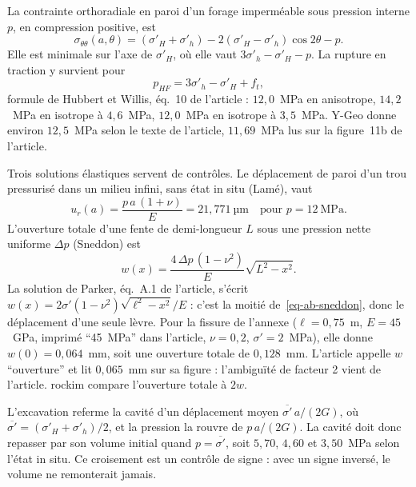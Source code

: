 La contrainte orthoradiale en paroi d'un forage imperméable sous pression interne $p$, en compression positive, est
\begin{equation}
\sigma_{\theta\theta}(a, \theta) = (\sigma'_H + \sigma'_h) - 2(\sigma'_H - \sigma'_h)\cos 2\theta - p .
\end{equation}
Elle est minimale sur l'axe de $\sigma'_H$, où elle vaut $3\sigma'_h - \sigma'_H - p$. La rupture en traction y survient pour
\begin{equation}
p_{HF} = 3\sigma'_h - \sigma'_H + f_t ,
\label{eq-ab-hubbert}
\end{equation}
formule de Hubbert et Willis, éq.~10 de l'article : $12{,}0$~MPa en anisotrope, $14{,}2$~MPa en isotrope à $4{,}6$~MPa, $12{,}0$~MPa en isotrope à $3{,}5$~MPa. Y-Geo donne environ $12{,}5$~MPa selon le texte de l'article, $11{,}69$~MPa lus sur la figure~11b de l'article.

Trois solutions élastiques servent de contrôles. Le déplacement de paroi d'un trou pressurisé dans un milieu infini, sans état in situ (Lamé), vaut
\begin{equation}
u_r(a) = \frac{p\,a\,(1 + \nu)}{E} = 21{,}771~\text{µm} \quad \text{pour } p = 12~\text{MPa} .
\end{equation}
L'ouverture totale d'une fente de demi-longueur $L$ sous une pression nette uniforme $\Delta p$ (Sneddon) est
\begin{equation}
w(x) = \frac{4\,\Delta p\,(1 - \nu^2)}{E}\sqrt{L^2 - x^2} .
\label{eq-ab-sneddon}
\end{equation}
La solution de Parker, éq.~A.1 de l'article, s'écrit $w(x) = 2\sigma'(1 - \nu^2)\sqrt{\ell^2 - x^2}/E$ : c'est la moitié de~\eqref{eq-ab-sneddon}, donc le déplacement d'une seule lèvre. Pour la fissure de l'annexe ($\ell = 0{,}75$~m, $E = 45$~GPa, imprimé \enquote{45~MPa} dans l'article, $\nu = 0{,}2$, $\sigma' = 2$~MPa), elle donne $w(0) = 0{,}064$~mm, soit une ouverture totale de $0{,}128$~mm. L'article appelle $w$ \enquote{ouverture} et lit $0{,}065$~mm sur sa figure : l'ambiguïté de facteur 2 vient de l'article. rockim compare l'ouverture totale à $2w$.

L'excavation referme la cavité d'un déplacement moyen $\overline{\sigma'}\,a/(2G)$, où $\overline{\sigma'} = (\sigma'_H + \sigma'_h)/2$, et la pression la rouvre de $p\,a/(2G)$. La cavité doit donc repasser par son volume initial quand $p = \overline{\sigma'}$, soit $5{,}70$, $4{,}60$ et $3{,}50$~MPa selon l'état in situ. Ce croisement est un contrôle de signe : avec un signe inversé, le volume ne remonterait jamais.

